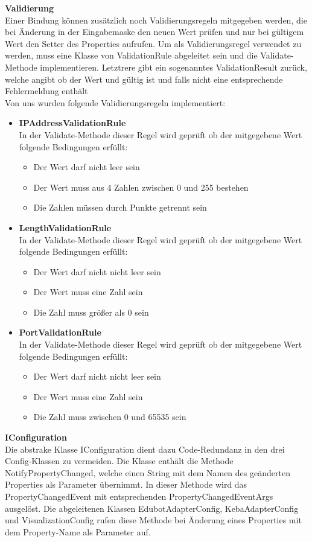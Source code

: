 \textbf{Validierung}\\
Einer Bindung können zusätzlich noch Validierungsregeln mitgegeben werden, die bei Änderung in der Eingabemaske den neuen Wert prüfen und nur bei gültigem Wert den Setter des Properties aufrufen. Um als Validierungsregel verwendet zu werden, muss eine Klasse von ValidationRule abgeleitet sein und die Validate-Methode implementieren. Letztrere gibt ein sogenanntes ValidationResult zurück, welche angibt ob der Wert und gültig ist und falls nicht eine entsprechende Fehlermeldung enthält\\
Von uns wurden folgende Validierungsregeln implementiert:
\begin{itemize}
\item \textbf{IPAddressValidationRule}\\
In der Validate-Methode dieser Regel wird geprüft ob der mitgegebene Wert folgende Bedingungen erfüllt:
\begin{itemize}
\item Der Wert darf nicht leer sein
\item Der Wert muss aus 4 Zahlen zwischen 0 und 255 bestehen
\item Die Zahlen müssen durch Punkte getrennt sein
\end{itemize}
\item \textbf{LengthValidationRule}\\
In der Validate-Methode dieser Regel wird geprüft ob der mitgegebene Wert folgende Bedingungen erfüllt:
\begin{itemize}
\item Der Wert darf nicht nicht leer sein
\item Der Wert muss eine Zahl sein
\item Die Zahl muss größer als 0 sein
\end{itemize}
\item \textbf{PortValidationRule}\\
In der Validate-Methode dieser Regel wird geprüft ob der mitgegebene Wert folgende Bedingungen erfüllt:
\begin{itemize}
\item Der Wert darf nicht nicht leer sein
\item Der Wert muss eine Zahl sein
\item Die Zahl muss zwischen 0 und 65535 sein
\end{itemize}
\end{itemize}
\textbf{IConfiguration}\\
Die abstrake Klasse IConfiguration dient dazu Code-Redundanz in den drei Config-Klassen zu vermeiden. Die Klasse enthält die Methode NotifyPropertyChanged, welche einen String mit dem Namen des geänderten Properties als Parameter übernimmt. In dieser Methode wird das PropertyChangedEvent mit entsprechenden PropertyChangedEventArgs ausgelöst. Die abgeleitenen Klassen EdubotAdapterConfig, KebaAdapterConfig und VisualizationConfig rufen diese Methode bei Änderung eines Properties mit dem Property-Name als Parameter auf.


